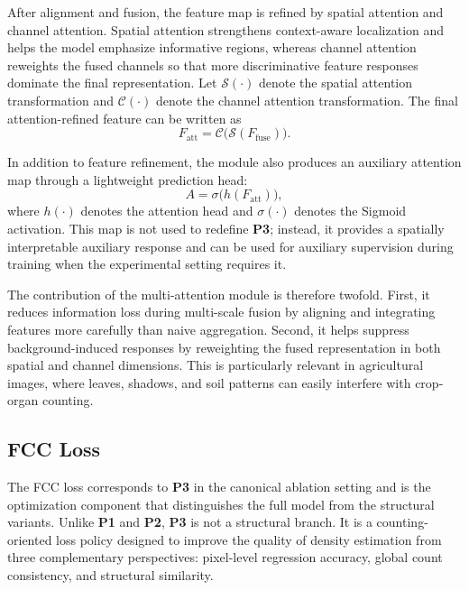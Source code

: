 \documentclass[a4paper,fleqn]{cas-sc}
\begin{document}
After alignment and fusion, the feature map is refined by spatial attention and channel attention. Spatial attention strengthens context-aware localization and helps the model emphasize informative regions, whereas channel attention reweights the fused channels so that more discriminative feature responses dominate the final representation. Let $\mathcal{S}(\cdot)$ denote the spatial attention transformation and $\mathcal{C}(\cdot)$ denote the channel attention transformation. The final attention-refined feature can be written as
\begin{equation}
    F_{\mathrm{att}} = \mathcal{C}\big(\mathcal{S}(F_{\mathrm{fuse}})\big).
\end{equation}

In addition to feature refinement, the module also produces an auxiliary attention map through a lightweight prediction head:
\begin{equation}
    A = \sigma \big( h(F_{\mathrm{att}}) \big),
\end{equation}
where $h(\cdot)$ denotes the attention head and $\sigma(\cdot)$ denotes the Sigmoid activation. This map is not used to redefine \textbf{P3}; instead, it provides a spatially interpretable auxiliary response and can be used for auxiliary supervision during training when the experimental setting requires it.

The contribution of the multi-attention module is therefore twofold. First, it reduces information loss during multi-scale fusion by aligning and integrating features more carefully than naive aggregation. Second, it helps suppress background-induced responses by reweighting the fused representation in both spatial and channel dimensions. This is particularly relevant in agricultural images, where leaves, shadows, and soil patterns can easily interfere with crop-organ counting.

\subsection{FCC Loss}

The FCC loss corresponds to \textbf{P3} in the canonical ablation setting and is the optimization component that distinguishes the full model from the structural variants. Unlike \textbf{P1} and \textbf{P2}, \textbf{P3} is not a structural branch. It is a counting-oriented loss policy designed to improve the quality of density estimation from three complementary perspectives: pixel-level regression accuracy, global count consistency, and structural similarity.
\end{document}
